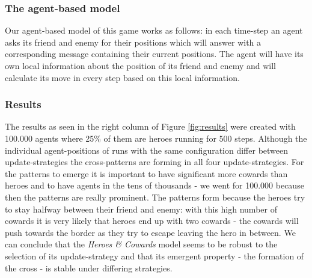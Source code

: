 \subsubsection{The agent-based model}
Our agent-based model of this game works as follows: in each time-step an agent asks its friend and enemy for their positions which will answer with a corresponding message containing their current positions. The agent will have its own local information about the position of its friend and enemy and will calculate its move in every step based on this local information.

\subsubsection{Results}
The results as seen in the right column of Figure \ref{fig:results} were created with 100.000 agents where 25\% of them are heroes running for 500 steps. Although the individual agent-positions of runs with the same configuration differ between update-strategies the cross-patterns are forming in all four update-strategies. For the patterns to emerge it is important to have significant more cowards than heroes and to have agents in the tens of thousands - we went for 100.000 because then the patterns are really prominent. The patterns form because the heroes try to stay halfway between their friend and enemy: with this high number of cowards it is very likely that heroes end up with two cowards - the cowards will push towards the border as they try to escape leaving the hero in between. We can conclude that the \textit{Heroes \& Cowards} model seems to be robust to the selection of its update-strategy and that its emergent property - the formation of the cross - is stable under differing strategies.